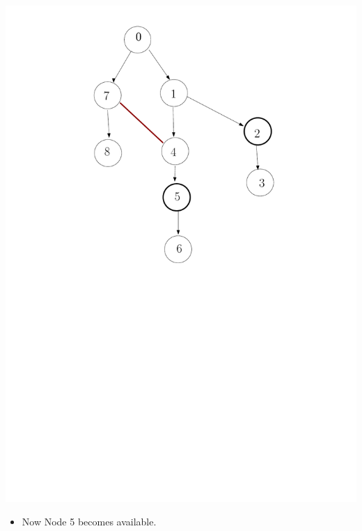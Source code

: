 \documentclass[12pt]{beamer}
\begin{document}
\begin{frame}[plain]
  \includegraphics[scale=0.3]{VisitMap2.pdf}
  \begin{itemize}
  \item Now Node 5 becomes available. 
  \end{itemize}
\end{frame}
\end{document}
